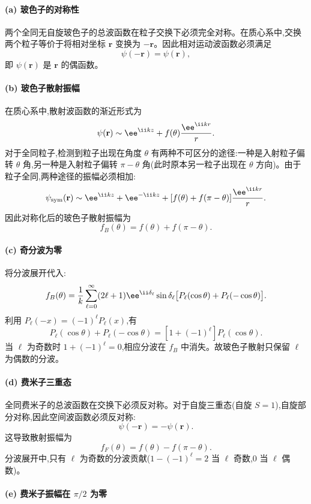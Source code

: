 \begin{solution}
\paragraph{(a) 玻色子的对称性}

两个全同无自旋玻色子的总波函数在粒子交换下必须完全对称。在质心系中,交换两个粒子等价于将相对坐标 $\mathbf r$ 变换为 $-\mathbf r$。因此相对运动波函数必须满足
\[
\psi(-\mathbf r)=\psi(\mathbf r),
\]
即 $\psi(\mathbf r)$ 是 $\mathbf r$ 的偶函数。

\paragraph{(b) 玻色子散射振幅}

在质心系中,散射波函数的渐近形式为
\[
\psi(\mathbf r)\sim \ee^{\ii kz}+f(\theta){\ee^{\ii kr}\over r}.
\]
对于全同粒子,检测到粒子出现在角度 $\theta$ 有两种不可区分的途径:一种是入射粒子偏转 $\theta$ 角,另一种是入射粒子偏转 $\pi-\theta$ 角(此时原本另一粒子出现在 $\theta$ 方向)。由于粒子全同,两种途径的振幅必须相加:
\[
\psi_{\text{sym}}(\mathbf r)\sim \ee^{\ii kz}+\ee^{-\ii kz}+[f(\theta)+f(\pi-\theta)]{\ee^{\ii kr}\over r}.
\]
因此对称化后的玻色子散射振幅为
\[
\boxed{f_B(\theta)=f(\theta)+f(\pi-\theta).}
\]

\paragraph{(c) 奇分波为零}

将分波展开代入:
\[
f_B(\theta)={1\over k}\sum_{\ell=0}^{\infty}(2\ell+1)\ee^{\ii\delta_\ell}\sin\delta_\ell\bigl[P_\ell(\cos\theta)+P_\ell(-\cos\theta)\bigr].
\]
利用 $P_\ell(-x)=(-1)^\ell P_\ell(x)$,有
\[
P_\ell(\cos\theta)+P_\ell(-\cos\theta)=[1+(-1)^\ell]P_\ell(\cos\theta).
\]
当 $\ell$ 为奇数时 $1+(-1)^\ell=0$,相应分波在 $f_B$ 中消失。故玻色子散射只保留 $\ell$ 为偶数的分波。

\paragraph{(d) 费米子三重态}

全同费米子的总波函数在交换下必须反对称。对于自旋三重态(自旋 $S=1$),自旋部分对称,因此空间波函数必须反对称:
\[
\psi(-\mathbf r)=-\psi(\mathbf r).
\]
这导致散射振幅为
\[
\boxed{f_F(\theta)=f(\theta)-f(\pi-\theta).}
\]
分波展开中,只有 $\ell$ 为奇数的分波贡献($1-(-1)^\ell=2$ 当 $\ell$ 奇数,$0$ 当 $\ell$ 偶数)。

\paragraph{(e) 费米子振幅在 $\pi/2$ 为零}


\end{solution}
